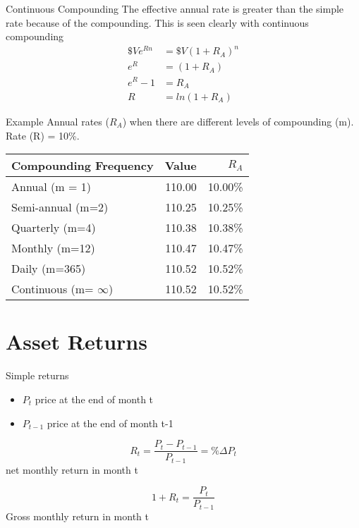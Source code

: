\documentclass[14pt,xcolor=pdftex,dvipsnames,table]{beamer}
\begin{document}
\begin{frame}{Continuous Compounding}
The effective annual rate is greater than the simple rate because of the compounding.  This is seen clearly with continuous compounding
\begin{align}
\$Ve^{Rn} &=\$V(1+R_A)^n\\
 e^R & =(1+R_A)\\
 e^R - 1 & = R_A\\
 R & = ln(1 + R_A)\label{eqref:ccln}
\end{align}
\end{frame}

\begin{frame}{Example}
Annual rates ($R_A$) when there are different levels of compounding (m).  Rate (R) = 10\%.  
\begin{center}
 \begin{tabular}{l | r |r}
Compounding Frequency & Value  & $R_A$\\
\hline
Annual (m = 1) & 110.00 & 10.00\%\\	
Semi-annual (m=2) & 110.25 & 10.25\%\\
Quarterly (m=4) & 110.38 & 10.38\%\\
Monthly (m=12) & 110.47 & 10.47\%\\
Daily (m=365) & 110.52 & 10.52\%\\
Continuous (m= $\infty$) & 110.52 & 10.52\%\\
\hline
\end{tabular}
\end{center}
\end{frame} 



\section{Asset Returns}
\begin{frame}{Simple returns}
\begin{itemize}
\item $P_t$ price at the end of month t
\item $P_{t-1}$ price at the end of month t-1
\end{itemize}
\begin{equation}
R_t=\frac{P_t - P_{t-1}}{P_{t-1}}=\% \Delta P_t
\end{equation}
net monthly return in month t

\begin{equation}
1+R_t=\frac{P_t}{P_{t-1}}
\end{equation}
Gross monthly return in month t
\end{frame}
\end{document}
